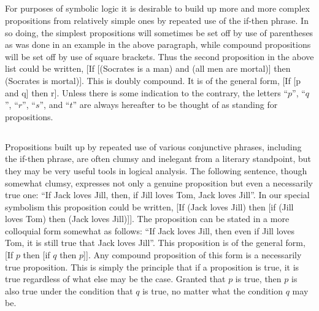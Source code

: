 \documentclass{book}
\let\oldmarginpar\marginpar
\renewcommand*{\marginpar}[1]{\oldmarginpar{\footnotesize#1}}
\begin{document}
\subsection{}
\label{sec:3.3}

For purposes of symbolic logic it is desirable to build up more and more complex propositions from relatively simple ones by repeated use of the if-then phrase.  In so doing, the simplest propositions will sometimes be set off by use of parentheses as was done in an example in the above paragraph, while compound propositions will be set off by use of square brackets.  Thus the second proposition in the above list could be written, [If [(Socrates is a man) and (all men are mortal)] then (Socrates is mortal)].  This is doubly compound.  It is of the general form, [If [p and q] then r].  Unless there is some indication to the contrary, the letters “\(p\)”, “\(q\)”, “\(r\)”, “\(s\)”, and “\(t\)” are always hereafter to be thought of as standing for propositions.

\subsection{}
\label{sec:3.4}

Propositions built up by repeated use of various conjunctive phrases, including the if-then phrase, are often clumsy and inelegant from a literary standpoint, but they may be very useful tools in logical analysis.  The following sentence, though somewhat clumsy, expresses not only a genuine proposition but even a necessarily true one: “If Jack loves Jill, then, if Jill loves Tom, Jack loves Jill”.  In our special symbolism this proposition could be written, [If (Jack \marginpar{\hfill 11}loves Jill) then [if (Jill loves Tom) then (Jack loves Jill)]].  The proposition can be stated in a more colloquial form somewhat as follows: “If Jack loves Jill, then even if Jill loves Tom, it is still true that Jack loves Jill”.  This proposition is of the general form, [If \(p\) then [if \(q\) then \(p\)]].  Any compound proposition of this form is a necessarily true proposition.  This is simply the principle that if a proposition is true, it is true regardless of what else may be the case.  Granted that \(p\) is true, then \(p\) is also true under the condition that \(q\) is true, no matter what the condition \(q\) may be.

\subsection{}
\label{sec:3.5}
\end{document}
